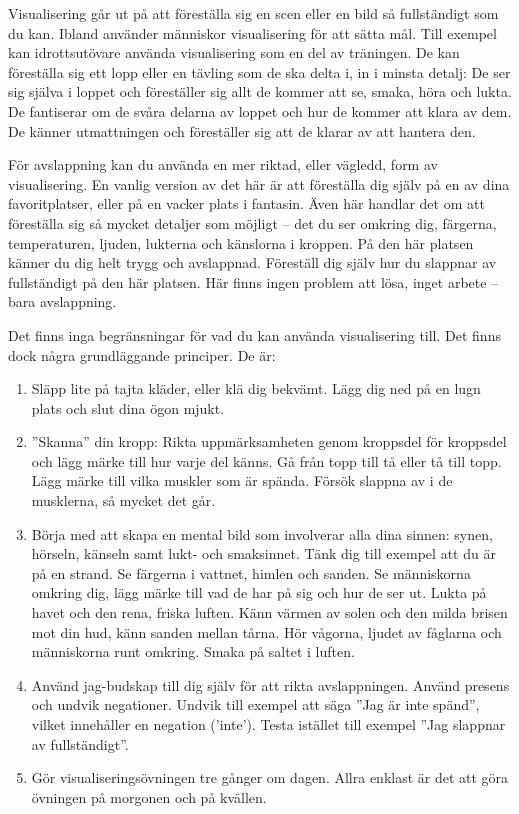 \documentclass[swedish,a4paper]{book}
\begin{document}
Visualisering går ut på att föreställa sig en scen eller en bild så fullständigt som du kan. Ibland använder människor visualisering för att sätta mål. Till exempel kan idrottsutövare använda visualisering som en del av träningen. De kan föreställa sig ett lopp eller en tävling som de ska delta i, in i minsta detalj: De ser sig själva i loppet och föreställer sig allt de kommer att se, smaka, höra och lukta. De fantiserar om de svåra delarna av loppet och hur de kommer att klara av dem. De känner utmattningen och föreställer sig att de klarar av att hantera den.

För avslappning kan du använda en mer riktad, eller vägledd, form av visualisering. En vanlig version av det här är att föreställa dig själv på en av dina favoritplatser, eller på en vacker plats i fantasin. Även här handlar det om att föreställa sig så mycket detaljer som möjligt -- det du ser omkring dig, färgerna, temperaturen, ljuden, lukterna och känslorna i kroppen. På den här platsen känner du dig helt trygg och avslappnad. Föreställ dig själv hur du slappnar av fullständigt på den här platsen. Här finns ingen problem att lösa, inget arbete -- bara avslappning.

Det finns inga begränsningar för vad du kan använda visualisering till. Det finns dock några grundläggande principer. De är:

\begin{enumerate}

\item Släpp lite på tajta kläder, eller klä dig bekvämt. Lägg dig ned på en lugn plats och slut dina ögon mjukt.

\item ''Skanna'' din kropp: Rikta uppmärksamheten genom kroppsdel för kroppsdel och lägg märke till hur varje del känns. Gå från topp till tå eller tå till topp. Lägg märke till vilka muskler som är spända. Försök slappna av i de musklerna, så mycket det går.

\item Börja med att skapa en mental bild som involverar alla dina sinnen: synen, hörseln, känseln samt lukt- och smaksinnet. Tänk dig till exempel att du är på en strand. Se färgerna i vattnet, himlen och sanden. Se människorna omkring dig, lägg märke till vad de har på sig och hur de ser ut. Lukta på havet och den rena, friska luften. Känn värmen av solen och den milda brisen mot din hud, känn sanden mellan tårna. Hör vågorna, ljudet av fåglarna och människorna runt omkring. Smaka på saltet i luften.

\item Använd jag-budskap till dig själv för att rikta avslappningen. Använd presens och undvik negationer. Undvik till exempel att säga ''Jag är inte spänd'', vilket innehåller en negation ('inte'). Testa istället till exempel ''Jag slappnar av fullständigt''.

\item Gör visualiseringsövningen tre gånger om dagen. Allra enklast är det att göra övningen på morgonen och på kvällen.

\end{enumerate}
\end{document}
